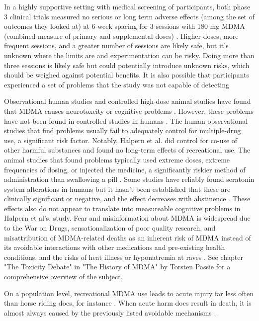 \documentclass[12pt,letterpaper]{article}
\begin{document}
In a highly supportive setting with medical screening of participants, both phase 3 clinical trials measured no serious or long term adverse effects (among the set of outcomes they looked at) at 6-week spacing for 3 sessions with 180 mg MDMA (combined measure of primary and supplemental doses) \cite{mitchellMDMAClinicalTrial,mitchellMDMAClinicalTrial2}. Higher doses, more frequent sessions, and a greater number of sessions are likely safe, but it's unknown where the limits are and experimentation can be risky. Doing more than three sessions is likely safe but could potentially introduce unknown risks, which should be weighed against potential benefits. It is also possible that participants experienced a set of problems that the study was not capable of detecting 

Observational human studies and controlled high-dose animal studies have found that MDMA causes neurotoxcity or cognitive problems \cite{passieHistory}. However, these problems have not been found in controlled studies in humans \cite{halpernMormonRavers,mitchellMDMAClinicalTrial}. The human observational studies that find problems usually fail to adequately control for multiple-drug use, a significant risk factor. Notably, Halpern et al. did control for co-use of other harmful substances and found no long-term effects of recreational use. The animal studies that found problems typically used extreme doses, extreme frequencies of dosing, or injected the medicine, a significantly riskier method of administration than swallowing a pill \cite{passieHistory}. Some studies have reliably found seratonin system alterations in humans but it hasn't been established that these are clinically significant or negative, and the effect decreases with abstinence \cite{gouzoulis2006neurotoxicity}. These effects also do not appear to translate into measureable cognitive problems in Halpern et al's. study. Fear and misinformation about MDMA is widespread due to the War on Drugs, sensationalization of poor quality research, and misattribution of MDMA-related deaths as an inherent risk of MDMA instead of its avoidable interactions with other medications and pre-existing health conditions, and the risks of heat illness or hyponatremia at raves \cite{passieHistory}. See chapter "The Toxicity Debate" in "The History of MDMA" by Torsten Passie for a comprehensive overview of the subject.

On a population level, recreational MDMA use leads to acute injury far less often than horse riding does, for instance \cite{nutt2009equasy}. When acute harm does result in death, it is almost always caused by the previously listed avoidable mechanisms \cite{riggDeaths}.
\end{document}
